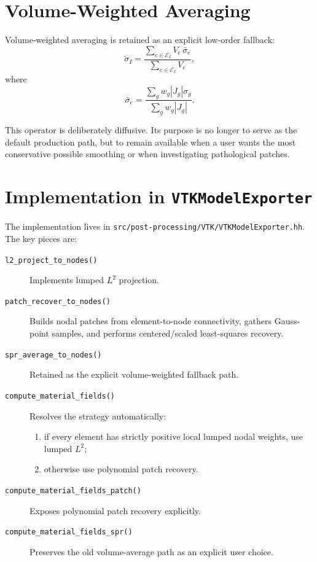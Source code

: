 \section{Volume-Weighted Averaging}
\label{sec:projection_volume_average}

Volume-weighted averaging is retained as an explicit low-order fallback:
\begin{equation}
  \tilde{\sigma}_I
  = \frac{\displaystyle\sum_{e \in \mathcal{E}_I} V_e\, \bar{\sigma}_e}
         {\displaystyle\sum_{e \in \mathcal{E}_I} V_e},
\end{equation}
where
\begin{equation}
  \bar{\sigma}_e
  = \frac{\sum_g w_g |J_g| \sigma_g}{\sum_g w_g |J_g|}.
\end{equation}

This operator is deliberately diffusive.  Its purpose is no longer to serve as
the default production path, but to remain available when a user wants the
most conservative possible smoothing or when investigating pathological
patches.


\section{Implementation in \texttt{VTKModelExporter}}
\label{sec:projection_impl}

The implementation lives in \texttt{src/post-processing/VTK/VTKModelExporter.hh}.
The key pieces are:
\begin{description}
  \item[\texttt{l2\_project\_to\_nodes()}]
    Implements lumped $L^2$ projection.

  \item[\texttt{patch\_recover\_to\_nodes()}]
    Builds nodal patches from element-to-node connectivity, gathers Gauss-point
    samples, and performs centered/scaled least-squares recovery.

  \item[\texttt{spr\_average\_to\_nodes()}]
    Retained as the explicit volume-weighted fallback path.

  \item[\texttt{compute\_material\_fields()}]
    Resolves the strategy automatically:
    \begin{enumerate}[nosep]
      \item if every element has strictly positive local lumped nodal weights,
            use lumped $L^2$;
      \item otherwise use polynomial patch recovery.
    \end{enumerate}

  \item[\texttt{compute\_material\_fields\_patch()}]
    Exposes polynomial patch recovery explicitly.

  \item[\texttt{compute\_material\_fields\_spr()}]
    Preserves the old volume-average path as an explicit user choice.
\end{description}

